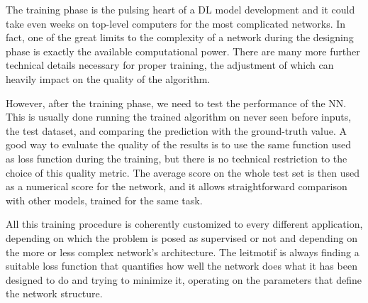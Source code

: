 The training phase is the pulsing heart of a DL model development and it could take even weeks on top-level computers for the most complicated networks. In fact, one of the great limits to the complexity of a network during the designing phase is exactly the available computational power. There are many more further technical details necessary for proper training, the adjustment of which can heavily impact on the quality of the algorithm.

However, after the training phase, we need to test the performance of the NN. This is usually done running the trained algorithm on never seen before inputs, the test dataset, and comparing the prediction with the ground-truth value. A good way to evaluate the quality of the results is to use the same function used as loss function during the training, but there is no technical restriction to the choice of this quality metric. The average score on the whole test set is then used as a numerical score for the network, and it allows straightforward comparison with other models, trained for the same task.

All this training procedure is coherently customized to every different application, depending on which the problem is posed as supervised or not and depending on the more or less complex network's architecture. The leitmotif is always finding a suitable loss function that quantifies how well the network does what it has been designed to do and trying to minimize it, operating on the parameters that define the network structure.

\clearpage
